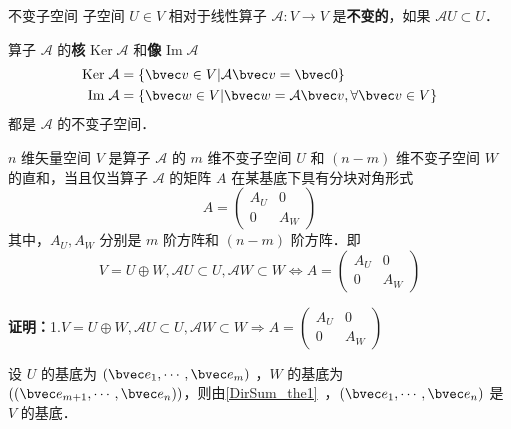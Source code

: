 


\begin{definition}{不变子空间}
子空间 $U\in V$ 相对于线性算子 $\mathcal{A}:V\rightarrow V$ 是\textbf{不变的}，如果 $\mathcal{A}U\subset U$．
\end{definition}
\begin{example}{}
算子 $\mathcal{A}$ 的\textbf{核} $\mathrm{Ker}\;\mathcal A$ 和\textbf{像} $\mathrm{Im}\;\mathcal{A}$
\begin{equation}\label{InvSP_eq3}
\begin{aligned}
\mathrm{Ker}\;\mathcal{A}&=\{\bvec v\in V|\mathcal{A}\bvec v=\bvec 0\}\\
\mathrm{Im}\;\mathcal{A}&=\{\bvec w\in V|\bvec w=\mathcal{A}\bvec v,\forall\bvec v\in V\}
\end{aligned}
\end{equation}
都是 $\mathcal A$ 的不变子空间．
\end{example}
\begin{theorem}{}
$n$ 维矢量空间 $V$ 是算子 $\mathcal{A}$ 的 $m$ 维不变子空间 $U$ 和 $(n-m)$ 维不变子空间 $W$ 的直和，当且仅当算子 $\mathcal{A}$ 的矩阵 $A$ 在某基底下具有分块对角形式
\begin{equation}\label{InvSP_eq1}
A=\begin{pmatrix}
A_U&0\\
0&A_W
\end{pmatrix}
\end{equation}
其中，$A_U,A_W$ 分别是 $m$ 阶方阵和 $(n-m)$ 阶方阵．即
\begin{equation}
V=U\oplus W,\mathcal{A}U\subset U,\mathcal{A}W\subset W\Leftrightarrow A=\begin{pmatrix}
A_U&0\\
0&A_W
\end{pmatrix}
\end{equation}

\end{theorem}
\textbf{证明：}1.$
V=U\oplus W,\mathcal{A}U\subset U,\mathcal{A}W\subset W\Rightarrow A=\begin{pmatrix}
A_U&0\\
0&A_W
\end{pmatrix}
$

设 $U$ 的基底为 $(\bvec e_1,\cdots,\bvec e_m)$ ，$W$ 的基底为 $((\bvec e_{m+1},\cdots,\bvec e_n))$，则由\autoref{DirSum_the1}~，$(\bvec e_{1},\cdots,\bvec e_n)$ 是 $V$ 的基底．

